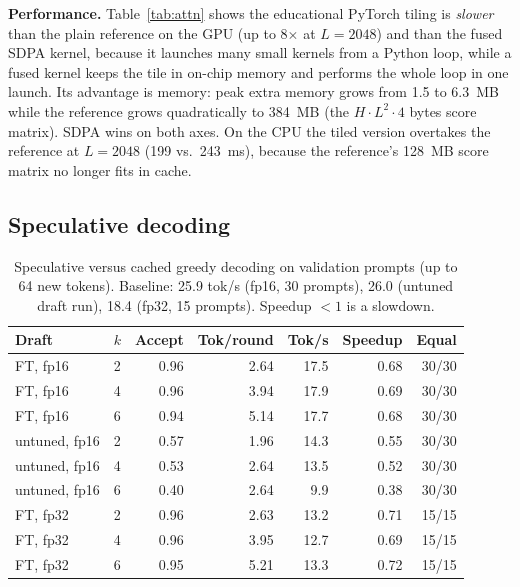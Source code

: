 \documentclass[conference]{IEEEtran}
\begin{document}
\textbf{Performance.} Table~\ref{tab:attn} shows the educational PyTorch tiling is \emph{slower} than the plain reference on the GPU (up to 8$\times$ at $L=2048$) and than the fused SDPA kernel, because it launches many small kernels from a Python loop, while a fused kernel keeps the tile in on-chip memory and performs the whole loop in one launch. Its advantage is memory: peak extra memory grows from 1.5 to 6.3~MB while the reference grows quadratically to 384~MB (the $H\cdot L^2\cdot4$ bytes score matrix). SDPA wins on both axes. On the CPU the tiled version overtakes the reference at $L=2048$ (199 vs.\ 243~ms), because the reference's 128~MB score matrix no longer fits in cache.

\subsection{Speculative decoding}
\begin{table}[t]
\centering\footnotesize
\caption{Speculative versus cached greedy decoding on validation prompts (up to 64 new tokens). Baseline: 25.9 tok/s (fp16, 30 prompts), 26.0 (untuned draft run), 18.4 (fp32, 15 prompts). Speedup $<1$ is a slowdown.}
\label{tab:spec}
\begin{tabular}{llrrrrr}\toprule
Draft & $k$ & Accept & Tok/round & Tok/s & Speedup & Equal\\\midrule
FT, fp16 & 2 & 0.96 & 2.64 & 17.5 & 0.68 & 30/30\\
FT, fp16 & 4 & 0.96 & 3.94 & 17.9 & 0.69 & 30/30\\
FT, fp16 & 6 & 0.94 & 5.14 & 17.7 & 0.68 & 30/30\\
untuned, fp16 & 2 & 0.57 & 1.96 & 14.3 & 0.55 & 30/30\\
untuned, fp16 & 4 & 0.53 & 2.64 & 13.5 & 0.52 & 30/30\\
untuned, fp16 & 6 & 0.40 & 2.64 & 9.9 & 0.38 & 30/30\\
FT, fp32 & 2 & 0.96 & 2.63 & 13.2 & 0.71 & 15/15\\
FT, fp32 & 4 & 0.96 & 3.95 & 12.7 & 0.69 & 15/15\\
FT, fp32 & 6 & 0.95 & 5.21 & 13.3 & 0.72 & 15/15\\\bottomrule
\end{tabular}
\end{table}
\end{document}
